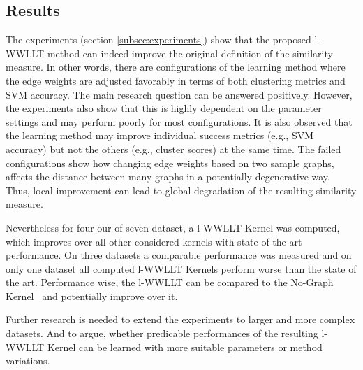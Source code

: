     \subsection{Results} \label{subsec:results}
		The experiments (section \ref{subsec:experiments}) show that the proposed l-WWLLT method can indeed improve the original definition of the similarity measure.
		In other words, there are configurations of the learning method where the edge weights are adjusted favorably in terms of both clustering metrics and SVM accuracy.
		The main research question can be answered positively.
		However, the experiments also show that this is highly dependent on the parameter settings and may perform poorly for most configurations.
		It is also observed that the learning method may improve individual success metrics (e.g., SVM accuracy) but not the others (e.g., cluster scores) at the same time.
		The failed configurations show how changing edge weights based on two sample graphs, affects the distance between many graphs in a potentially degenerative way.
		Thus, local improvement can lead to global degradation of the resulting similarity measure.
		
		Nevertheless for four our of seven dataset, a l-WWLLT Kernel was computed, which improves over all other considered kernels with state of the art performance.
		On three datasets a comparable performance was measured and on only one dataset all computed l-WWLLT Kernels perform worse than the state of the art.
		Performance wise, the l-WWLLT can be compared to the No-Graph Kernel~\cite{2019_Schulz_CONF} and potentially improve over it.
		
		Further research is needed to extend the experiments to larger and more complex datasets.
		And to argue, whether predicable performances of the resulting l-WWLLT Kernel can be learned with more suitable parameters or method variations.
       